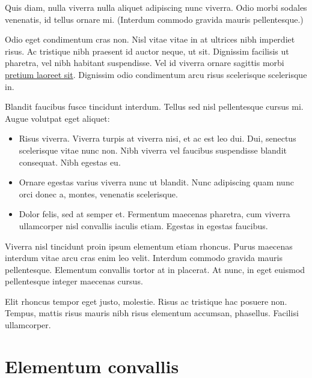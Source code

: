 \documentclass[
]{HyperedReport}
\begin{document}
Quis diam, nulla viverra nulla aliquet adipiscing nunc viverra. Odio morbi sodales venenatis, id tellus ornare mi. (Interdum commodo gravida mauris pellentesque.)

Odio eget condimentum cras non. Nisl vitae vitae in at ultrices nibh imperdiet risus. Ac tristique nibh praesent id auctor neque, ut sit. Dignissim facilisis ut pharetra, vel nibh habitant suspendisse. Vel id viverra ornare sagittis morbi \href{https://hypered.io}{pretium laoreet sit}. Dignissim odio condimentum arcu risus scelerisque scelerisque in.

Blandit faucibus fusce tincidunt interdum. Tellus sed nisl pellentesque cursus mi. Augue volutpat eget aliquet:

\begin{itemize}
	\item Risus viverra. Viverra turpis at viverra nisi, et ac est leo dui. Dui, senectus scelerisque vitae nunc non. Nibh viverra vel faucibus suspendisse blandit consequat. Nibh egestas eu.
	\item Ornare egestas varius viverra nunc ut blandit. Nunc adipiscing quam nunc orci donec a, montes, venenatis scelerisque.
	\item Dolor felis, sed at semper et. Fermentum maecenas pharetra, cum viverra ullamcorper nisl convallis iaculis etiam. Egestas in egestas faucibus.
\end{itemize}

Viverra nisl tincidunt proin ipsum elementum etiam rhoncus. Purus maecenas interdum vitae arcu cras enim leo velit. Interdum commodo gravida mauris pellentesque. Elementum convallis tortor at in placerat. At nunc, in eget euismod pellentesque integer maecenas cursus.

Elit rhoncus tempor eget justo, molestie. Risus ac tristique hac posuere non. Tempus, mattis risus mauris nibh risus elementum accumsan, phasellus. Facilisi ullamcorper.


\newpage

\section[Elementum convallis]{Elementum convallis} %
\end{document}

